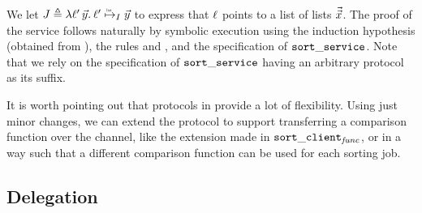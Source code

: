 \noindent
We let $\interpvarB \eqdef \Lam \loc'\,\vec\varB. \listrefI \interpvar {\loc'} {\vec\varB}$
to express that $\ell$ points to a list of lists $\vec{\vec{x}}$.
The proof of the service follows naturally by symbolic execution
using the induction hypothesis (obtained from ), the
rules  and , and the specification
of $\mathtt{sort\_service}$.
Note that we rely on the specification of $\mathtt{sort\_service}$ having an
arbitrary protocol as its suffix.

It is worth pointing out that protocols in \lname provide a lot of flexibility.
Using just minor changes, we can extend the protocol to support transferring a
comparison function over the channel, like the extension made in
$\mathtt{sort\_client}_{\mathit{func}}$,
or in a way such that a different comparison function can be used for each sorting job.

\subsection{Delegation}
\label{sec:delegation}

